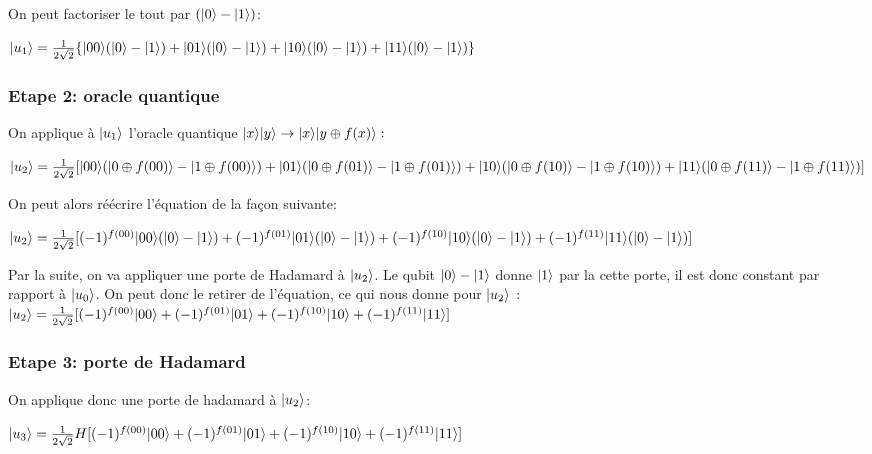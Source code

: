 \documentclass[12pt,a4paper]{article}
\DeclarePairedDelimiter\ket{\lvert}{\rangle}
\begin{document}
On peut factoriser le tout par $(\ket{0} - \ket{1})$: 

$
\ket{u_1} = \frac{1}{2\sqrt{2}}\{\ket{00}(\ket{0} - \ket{1}) + \ket{01}(\ket{0} - \ket{1}) + \ket{10}(\ket{0} - \ket{1}) + \ket{11}(\ket{0} - \ket{1})\}
$

\subsubsection{Etape 2: oracle quantique}

On applique à $\ket{u_1}$ l'oracle quantique $\ket{x}\ket{y}\rightarrow\ket{x}\ket{y\oplus f(x)}:$

$
\ket{u_2} = \frac{1}{2\sqrt{2}}[ \\ 
\ket{00}(\ket{0 \oplus f(00)} - \ket{1 \oplus f(00)}) + \\
\ket{01}(\ket{0 \oplus f(01)} - \ket{1 \oplus f(01)}) + \\
\ket{10}(\ket{0 \oplus f(10)} - \ket{1 \oplus f(10)}) + \\
\ket{11}(\ket{0 \oplus f(11)} - \ket{1 \oplus f(11)})]
$

\medbreak
On peut alors réécrire l'équation de la façon suivante: 

$
\ket{u_2} = \frac{1}{2\sqrt{2}}[ \\
(-1)^{f(00)} \ket{00}  (\ket{0} - \ket{1}) + \\
(-1)^{f(01)} \ket{01}  (\ket{0} - \ket{1}) + \\
(-1)^{f(10)} \ket{10}  (\ket{0} - \ket{1}) + \\
(-1)^{f(11)} \ket{11}  (\ket{0} - \ket{1}) ]
$

Par la suite, on va appliquer une porte de Hadamard à $\ket{u_2}$. Le qubit $\ket{0} - \ket{1}$ donne $\ket{1}$ par la cette porte, il est donc constant par rapport à $\ket{u_0}$. On peut donc le retirer de l'équation, ce qui nous donne pour $\ket{u_2}$ :
\medbreak
$
\ket{u_2} = \frac{1}{2\sqrt{2}}[(-1)^{f(00)} \ket{00} + (-1)^{f(01)} \ket{01} + (-1)^{f(10)} \ket{10} + (-1)^{f(11)} \ket{11} ]
$

\subsubsection{Etape 3: porte de Hadamard}

On applique donc une porte de hadamard à $\ket{u_2}$:

$
\ket{u_3} = \frac{1}{2\sqrt{2}} H [(-1)^{f(00)} \ket{00} + (-1)^{f(01)} \ket{01} + (-1)^{f(10)} \ket{10} + (-1)^{f(11)} \ket{11} ]
$
\end{document}
